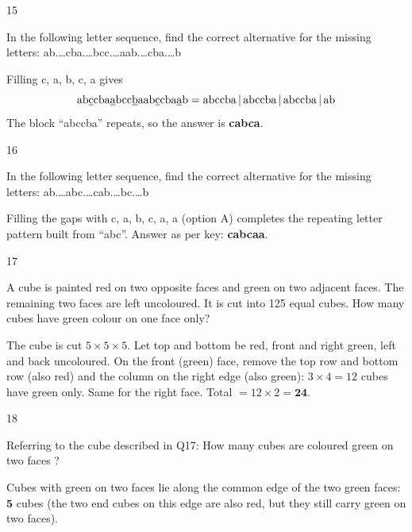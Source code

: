 \begin{question}{15}
{In the following letter sequence, find the correct alternative for the missing letters: ab.\ldots{}cba.\ldots{}bcc.\ldots{}aab.\ldots{}cba.\ldots{}b\par}
\begin{explain}
Filling c, a, b, c, a gives
\[\text{ab\underline{c}cba\underline{a}bcc\underline{b}aab\underline{c}cba\underline{a}b}=\text{abccba}\,|\,\text{abccba}\,|\,\text{abccba}\,|\,\text{ab}\]
The block ``abccba'' repeats, so the answer is \textbf{cabca}.
\end{explain}
\end{question}

\begin{question}{16}
{In the following letter sequence, find the correct alternative for the missing letters: ab.\ldots{}abc.\ldots{}cab.\ldots{}bc.\ldots{}b\par}
\begin{explain}
Filling the gaps with c, a, b, c, a, a (option A) completes the repeating letter pattern built from ``abc''. Answer as per key: \textbf{cabcaa}.
\end{explain}
\end{question}

\begin{question}{17}
{A cube is painted red on two opposite faces and green on two adjacent faces. The remaining two faces are left uncoloured. It is cut into 125 equal cubes. How many cubes have green colour on one face only?\par}
\begin{explain}
The cube is cut $5\times5\times5$. Let top and bottom be red, front and right green, left and back uncoloured.
On the front (green) face, remove the top row and bottom row (also red) and the column on the right edge (also green): $3\times4=12$ cubes have green only. Same for the right face.
Total $=12\times2=\mathbf{24}$.
\end{explain}
\end{question}

\begin{question}{18}
{Referring to the cube described in Q17: How many cubes are coloured green on two faces ?\par}
\begin{explain}
Cubes with green on two faces lie along the common edge of the two green faces: $\mathbf{5}$ cubes (the two end cubes on this edge are also red, but they still carry green on two faces).
\end{explain}
\end{question}

